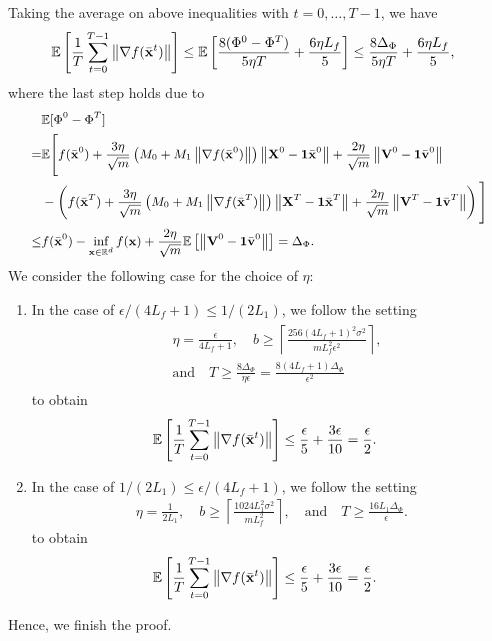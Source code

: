 \documentclass[sigconf]{acmart}
\newcommand{\Norm}[1]{\left\| #1 \right\|}
\def\vone{{\bf{1}}}
\def\vv{{\bf{v}}}
\def\vx{{\bf{x}}}
\def\BE{{\mathbb{E}}}
\def\BR{{\mathbb{R}}}
\def\mV {{\bf V}}
\def\mX {{\bf X}}
\theoremstyle{plain}
\def\bx{{\bar\vx}}
\def\bv{{\bar\vv}}
\begin{document}
Taking the average on above inequalities with $t=0,\dots,T-1$, we have
\begin{align*}
& \BE\left[\frac{1}{T}\sum_{t=0}^{T-1}\Norm{\nabla f(\bx^t)}\right] 
\leq \BE\left[\frac{8(\Phi^0 - \Phi^{T})}{5\eta T}  + \frac{6\eta L_f }{5}\right]
\leq  \frac{8\Delta_{\Phi}}{5\eta T}  + \frac{6\eta L_f}{5},
\end{align*}
where the last step holds due to
\begin{align*}\small
\begin{split}    
 & \BE[\Phi^0 - \Phi^T] \\
= & \BE\Bigg[f(\bx^0) + \frac{3\eta}{\sqrt{m}}\left(M_0 + M_1\Norm{\nabla f(\bx^0)}\right)\Norm{\mX^0-\vone\bx^0} + \frac{2\eta}{\sqrt{m}}\Norm{\mV^0-\vone\bv^0} \\
& - \left(f(\bx^T) + \frac{3\eta}{\sqrt{m}}\left(M_0 + M_1\Norm{\nabla f(\bx^T)}\right)\Norm{\mX^T-\vone\bx^T} + \frac{2\eta}{\sqrt{m}}\Norm{\mV^T-\vone\bv^T}\right)\Bigg] \\
\leq & f(\bx^0) - \inf_{\vx\in\BR^d} f(\vx)  + \frac{2\eta}{\sqrt{m}}\BE\left[\Norm{\mV^0-\vone\bv^0}\right] = \Delta_{\Phi}.
\end{split}
\end{align*}
We consider the following case for the choice of $\eta$:
\begin{enumerate}
    \item In the case of $\epsilon/(4L_f+1)\leq 1/(2L_1)$, we follow the setting 
    \begin{align}\label{eq:setting-1}
    \begin{split}        
        & \eta=\frac{\epsilon}{4L_f+1}, \quad
        b \geq \left\lceil \frac{256(4L_f+1)^2\sigma^2}{mL_f^2\epsilon^2}\right\rceil, \\
         & \text{and} \quad
        T \geq \frac{8\Delta_{\Phi}}{\eta\epsilon} = \frac{8(4L_f+1)\Delta_{\Phi}}{\epsilon^2}
    \end{split}
    \end{align}
    to obtain 
    \begin{align*}
    & \BE\left[\frac{1}{T}\sum_{t=0}^{T-1}\Norm{\nabla f(\bx^t)}\right]  
    \leq  \frac{\epsilon}{5}  + \frac{3\epsilon}{10} = \frac{\epsilon}{2}.
    \end{align*}
    \item In the case of $1/(2L_1)\leq\epsilon/(4L_f+1)$, we follow the setting
    \begin{align}\label{eq:setting-2}
        \eta=\frac{1}{2L_1},\quad
        b \geq \left\lceil \frac{1024L_1^2\sigma^2}{m L_f^2}\right\rceil,\quad\text{and}\quad
        T \geq \frac{16L_1\Delta_{\Phi}}{\epsilon}.
    \end{align}
    to obtain
    \begin{align*}
    & \BE\left[\frac{1}{T}\sum_{t=0}^{T-1}\Norm{\nabla f(\bx^t)}\right]  
    \leq \frac{\epsilon}{5} + \frac{3\epsilon}{10} = \frac{\epsilon}{2}.
    \end{align*}
\end{enumerate}
Hence, we finish the proof.
\end{document}
